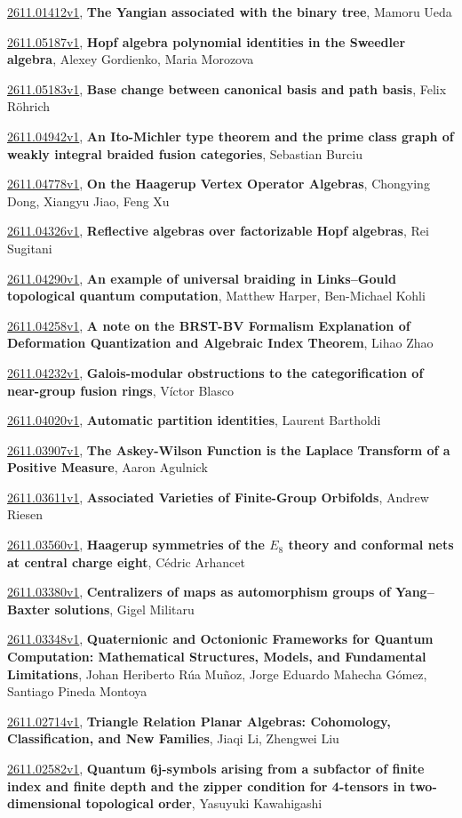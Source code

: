 \documentclass[9pt, a4paper]{article}
\theoremstyle{plain}
\theoremstyle{definition}
\theoremstyle{remark}
\newcommand{\arxiv}[3]{\href{https://arxiv.org/abs/#1}{#1}, \textbf{\textcolor{arxivblue}{#2}}, #3}
\begin{document}
\arxiv{2611.01412v1}{The Yangian associated with the binary tree}{Mamoru Ueda}

\arxiv{2611.05187v1}{Hopf algebra polynomial identities in the Sweedler algebra}{Alexey Gordienko, Maria Morozova}

\arxiv{2611.05183v1}{Base change between canonical basis and path basis}{Felix Röhrich}

\arxiv{2611.04942v1}{An Ito-Michler type theorem and the prime class graph of weakly integral braided fusion categories}{Sebastian Burciu}

\arxiv{2611.04778v1}{On the Haagerup Vertex Operator Algebras}{Chongying Dong, Xiangyu Jiao, Feng Xu}

\arxiv{2611.04326v1}{Reflective algebras over factorizable Hopf algebras}{Rei Sugitani}

\arxiv{2611.04290v1}{An example of universal braiding in Links--Gould topological quantum computation}{Matthew Harper, Ben-Michael Kohli}

\arxiv{2611.04258v1}{A note on the BRST-BV Formalism Explanation of Deformation Quantization and Algebraic Index Theorem}{Lihao Zhao}

\arxiv{2611.04232v1}{Galois-modular obstructions to the categorification of near-group fusion rings}{Víctor Blasco}

\arxiv{2611.04020v1}{Automatic partition identities}{Laurent Bartholdi}

\arxiv{2611.03907v1}{The Askey-Wilson Function is the Laplace Transform of a Positive Measure}{Aaron Agulnick}

\arxiv{2611.03611v1}{Associated Varieties of Finite-Group Orbifolds}{Andrew Riesen}

\arxiv{2611.03560v1}{Haagerup symmetries of the $E_8$ theory and conformal nets at central charge eight}{Cédric Arhancet}

\arxiv{2611.03380v1}{Centralizers of maps as automorphism groups of Yang--Baxter solutions}{Gigel Militaru}

\arxiv{2611.03348v1}{Quaternionic and Octonionic Frameworks for Quantum Computation: Mathematical Structures, Models, and Fundamental Limitations}{Johan Heriberto Rúa Muñoz, Jorge Eduardo Mahecha Gómez, Santiago Pineda Montoya}

\arxiv{2611.02714v1}{Triangle Relation Planar Algebras: Cohomology, Classification, and New Families}{Jiaqi Li, Zhengwei Liu}

\arxiv{2611.02582v1}{Quantum 6j-symbols arising from a subfactor of finite index and finite depth and the zipper condition for 4-tensors in two-dimensional topological order}{Yasuyuki Kawahigashi}
\end{document}
